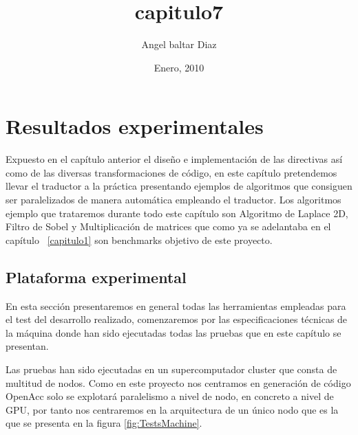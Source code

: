 


\title{capitulo7} 
\author{Angel baltar Diaz}
\date{\Large Enero, 2010} 

\chapter {Resultados experimentales}
\label{capitulo7}

Expuesto en el capítulo anterior el diseño e implementación de las directivas así como de las diversas transformaciones de código, en este capítulo pretendemos llevar el traductor a la práctica presentando ejemplos de algoritmos que consiguen ser paralelizados de manera automática empleando el traductor. Los algoritmos ejemplo que trataremos durante todo este capítulo son Algoritmo de Laplace 2D, Filtro de Sobel y Multiplicación de matrices que como ya se adelantaba en el capítulo ~\ref{capitulo1} son benchmarks objetivo de este proyecto.

\section{Plataforma experimental}

En esta sección presentaremos en general todas las herramientas empleadas para el test del desarrollo realizado, comenzaremos por las especificaciones técnicas de la máquina donde han sido ejecutadas todas las pruebas que en este capítulo se presentan.

Las pruebas han sido ejecutadas en un supercomputador cluster que consta de multitud de nodos. Como en este proyecto nos centramos en generación de código OpenAcc solo se explotará paralelismo a nivel de nodo, en concreto a nivel de GPU, por tanto nos centraremos en la arquitectura de un único nodo que es la que se presenta en la figura \ref{fig:TestsMachine}.

